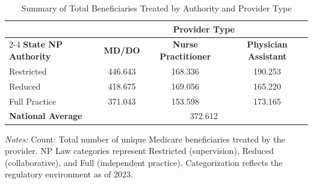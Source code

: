 \begin{table}[htbp]
    \centering
    \caption{Summary of Total Beneficiaries Treated by Authority and Provider Type}
    \label{tab:tot_benes_provtype}
    \vspace{0.2cm}
    \begin{tabular}{lccc}
        \toprule
        & \multicolumn{3}{c}{\textbf{Provider Type}} \\
        \cmidrule(lr){2-4}
        \textbf{State NP Authority} & \textbf{MD/DO} & \textbf{Nurse Practitioner} & \textbf{Physician Assistant} \\
        \midrule
        Restricted & 446.643 & 168.336 & 190.253 \\
        Reduced & 418.675 & 169.056 & 165.220 \\
        Full Practice & 371.043 & 153.598 & 173.165 \\
        \midrule
        \textbf{National Average} & \multicolumn{3}{c}{372.612} \\
        \bottomrule
    \end{tabular}
    \vspace{0.1cm}
    \begin{minipage}{0.85\textwidth}
        \footnotesize \textit{Notes:} Count: Total number of unique Medicare beneficiaries treated by the provider. NP Law categories represent Restricted (supervision), Reduced (collaborative), and Full (independent practice). Categorization reflects the regulatory environment as of 2023.
    \end{minipage}
\end{table}